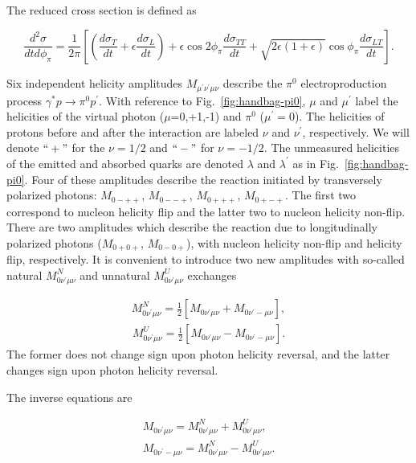 \documentclass[prc,floatfix,twocolumn,superscriptaddress,letter]{revtex4}
\begin{document}
The reduced cross section is defined as
\begin{widetext}
\begin{equation}
 \frac {d^2\sigma}    {dt d\phi_\pi}  =  \frac{1}{2\pi}
 \left[\left( \frac{d\sigma_T}{dt}+\epsilon \frac{d\sigma_L}{dt}\right)
+ \epsilon \cos 2 \phi_\pi  \frac{d\sigma_{TT}}{dt} + \sqrt{2\epsilon(1+\epsilon)} \cos \phi_\pi  \frac{d\sigma_{LT}}{dt} 
\right].
\label{eq:d2sigma}
\end{equation}
\end{widetext}



Six independent helicity amplitudes $M_{\mu^\prime\nu^\prime\mu\nu}$ describe the   $\pi^0$ electroproduction  process
$\gamma^*p\to\pi^0p^\prime$. With reference to Fig.~\ref{fig:handbag-pi0},  
$\mu$ and $\mu^\prime$ label the helicities of the virtual photon ($\mu$=0,+1,-1)  and $\pi^0$ ($\mu^\prime=0$).
The helicities of  protons before and after the interaction are labeled $\nu$ and $\nu^\prime$, respectively. We will denote  $``+"$ for the $\nu=1/2$ and $``-"$ for $\nu=-1/2$. The unmeasured helicities of the emitted and absorbed quarks are denoted $\lambda$ and $\lambda^\prime$ as in Fig.~\ref{fig:handbag-pi0}.
Four of these amplitudes describe the reaction initiated by transversely  polarized photons:  
$M_{0-++}$, $M_{0--+}$,  $M_{0+++}$, $M_{0+-+}$. The first two correspond to nucleon helicity flip and the latter two to nucleon helicity non-flip.  There are two amplitudes which describe 
the reaction due to  longitudinally polarized photons ($M_{0+0+}$, $M_{0-0+}$), with nucleon helicity non-flip and helicity flip, respectively.
It is convenient to introduce two new amplitudes with so-called natural $M^N_{0\nu^\prime\mu\nu}$ and unnatural 
$M^U_{0\nu^\prime\mu\nu}$ exchanges

\begin{align}
M^N_{0\nu^\prime\mu\nu}=\frac{1}{2}[M_{0\nu^\prime\mu\nu}+M_{0\nu^\prime-\mu\nu}],
\end{align}
\begin{align}
M^U_{0\nu^\prime\mu\nu}=\frac{1}{2}[M_{0\nu^\prime\mu\nu}-M_{0\nu^\prime-\mu\nu}].
\end{align}
The former does not change sign upon photon helicity  reversal, and the latter changes sign upon photon helicity reversal. 

The inverse equations are

\begin{align}
	M_{0\nu^\prime\mu\nu}= M^N_{0\nu^\prime\mu\nu}  + M^U_{0\nu^\prime\mu\nu},
\\	M_{0\nu^\prime -\mu\nu}= M^N_{0\nu^\prime\mu\nu} - M^U_{0\nu^\prime\mu\nu}.
\end{align}
\end{document}
